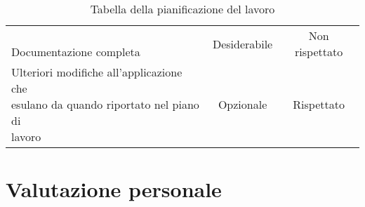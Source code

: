 \begin{table}[h]
\begin{tabularx}{\textwidth}{X|c|c}
		\makecell[l]{\vspace{-6pt} \\ Documentazione completa \\ \vspace{-6pt}} & Desiderabile & Non rispettato \\
		\makecell[l]{Ulteriori modifiche all'applicazione che \\ esulano da quando riportato nel piano di \\ lavoro} & Opzionale & Rispettato
	\end{tabularx}
	\vspace{5pt}
	\caption{Tabella della pianificazione del lavoro}
\end{table}

\section{Valutazione personale}

